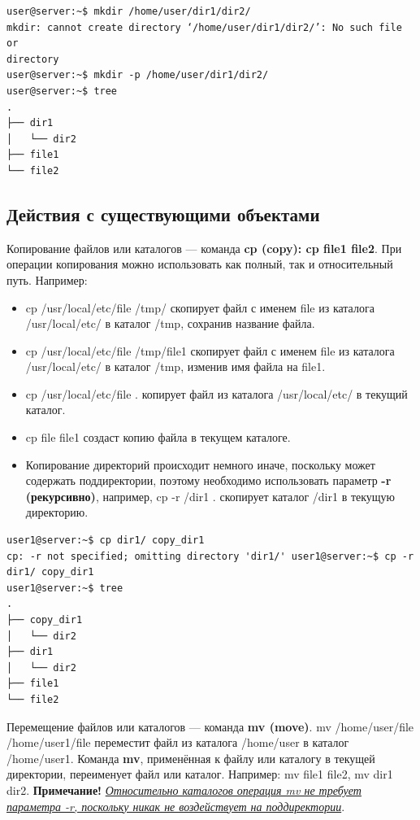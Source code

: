 \documentclass[14pt, a4paper]{article}
\begin{document}
\begin{lstlisting}
user@server:~$ mkdir /home/user/dir1/dir2/
mkdir: cannot create directory ‘/home/user/dir1/dir2/’: No such file or
directory
user@server:~$ mkdir -p /home/user/dir1/dir2/
user@server:~$ tree
.
├── dir1
│   └── dir2
├── file1
└── file2
\end{lstlisting}

\subsection*{Действия с существующими объектами}

Копирование файлов или каталогов — команда \textbf{cp (copy): cp file1 file2}. При операции
копирования можно использовать как полный, так и относительный путь. Например:

\begin{itemize}
    \item \colorbox{backcolour}{cp /usr/local/etc/file /tmp/} скопирует файл с именем file из каталога /usr/local/etc/ в
    каталог /tmp, сохранив название файла.
    \item \colorbox{backcolour}{cp /usr/local/etc/file /tmp/file1} скопирует файл с именем file из каталога
    /usr/local/etc/ в каталог /tmp, изменив имя файла на file1.
    \item \colorbox{backcolour}{cp /usr/local/etc/file .} копирует файл из каталога /usr/local/etc/ в текущий каталог.
    \item \colorbox{backcolour}{cp file file1} создаст копию файла в текущем каталоге.
    \item Копирование директорий происходит немного иначе, поскольку может содержать
    поддиректории, поэтому необходимо использовать параметр \textbf{-r (рекурсивно)}, например, \colorbox{backcolour}{cp
    -r /dir1 .} скопирует каталог /dir1 в текущую директорию.
\end{itemize}

\begin{lstlisting}
user1@server:~$ cp dir1/ copy_dir1
cp: -r not specified; omitting directory 'dir1/' user1@server:~$ cp -r  dir1/ copy_dir1 
user1@server:~$ tree
.
├── copy_dir1
│   └── dir2
├── dir1
│   └── dir2
├── file1
└── file2
\end{lstlisting}

Перемещение файлов или каталогов — команда \textbf{mv (move)}. \linebreak \colorbox{backcolour}{mv /home/user/file
/home/user1/file} переместит файл из каталога \linebreak /home/user в каталог /home/user1. Команда \textbf{mv},
применённая к файлу или каталогу в текущей директории, переименует файл или каталог. Например:
\colorbox{backcolour}{mv file1 file2, mv dir1 dir2}. \textbf{Примечание!} \textit{\uline{Относительно каталогов операция mv не
требует параметра -r, поскольку никак не воздействует на поддиректории}}.
\end{document}
